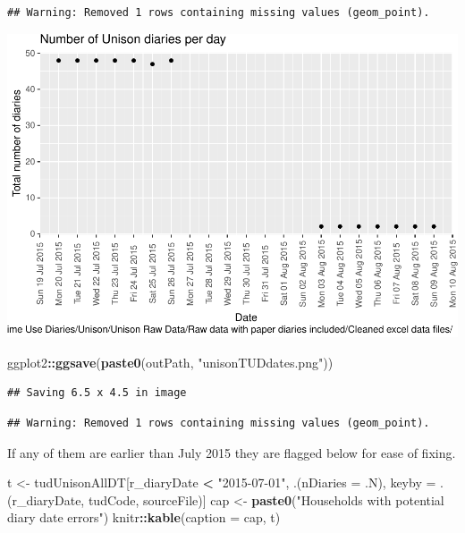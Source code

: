 \documentclass[]{article}
\newenvironment{Shaded}{\begin{snugshade}}{\end{snugshade}}
\newcommand{\KeywordTok}[1]{\textcolor[rgb]{0.13,0.29,0.53}{\textbf{#1}}}
\newcommand{\DataTypeTok}[1]{\textcolor[rgb]{0.13,0.29,0.53}{#1}}
\newcommand{\StringTok}[1]{\textcolor[rgb]{0.31,0.60,0.02}{#1}}
\newcommand{\OperatorTok}[1]{\textcolor[rgb]{0.81,0.36,0.00}{\textbf{#1}}}
\newcommand{\NormalTok}[1]{#1}
\begin{document}
\begin{verbatim}
## Warning: Removed 1 rows containing missing values (geom_point).
\end{verbatim}

\includegraphics{processNZGGTUDData_files/figure-latex/unisonDiaryPLot-1.pdf}

\begin{Shaded}
\begin{Highlighting}[]
\NormalTok{ggplot2}\OperatorTok{::}\KeywordTok{ggsave}\NormalTok{(}\KeywordTok{paste0}\NormalTok{(outPath, }\StringTok{"unisonTUDdates.png"}\NormalTok{))}
\end{Highlighting}
\end{Shaded}

\begin{verbatim}
## Saving 6.5 x 4.5 in image
\end{verbatim}

\begin{verbatim}
## Warning: Removed 1 rows containing missing values (geom_point).
\end{verbatim}

If any of them are earlier than July 2015 they are flagged below for
ease of fixing.

\begin{Shaded}
\begin{Highlighting}[]
\NormalTok{t <-}\StringTok{ }\NormalTok{tudUnisonAllDT[r_diaryDate }\OperatorTok{<}\StringTok{ "2015-07-01"}\NormalTok{, .(}\DataTypeTok{nDiaries =}\NormalTok{ .N), keyby =}\StringTok{ }\NormalTok{.(r_diaryDate, tudCode, sourceFile)]}
\NormalTok{cap <-}\StringTok{ }\KeywordTok{paste0}\NormalTok{(}\StringTok{"Households with potential diary date errors"}\NormalTok{)}
\NormalTok{knitr}\OperatorTok{::}\KeywordTok{kable}\NormalTok{(}\DataTypeTok{caption =}\NormalTok{ cap, t)}
\end{Highlighting}
\end{Shaded}
\end{document}
